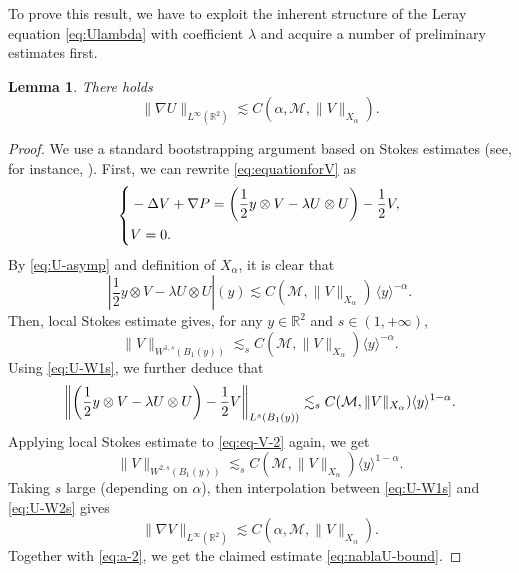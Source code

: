 \documentclass[12pt,reqno]{amsart}
\theoremstyle{plain}
\newtheorem{lemma}[theorem]{Lemma}
\theoremstyle{definition}
\newcommand{\R}{\mathbb{R}}
\newcommand{\M}{\mathcal{M}}
\renewcommand{\:}{\colon}
\let\div\relax
\DeclareMathOperator{\div}{div}
\numberwithin{equation}{section}
\numberwithin{figure}{section}
\begin{document}
To prove this result, we have to exploit the inherent structure of the Leray equation \eqref{eq:Ulambda} with coefficient $\lambda$  and acquire a number of preliminary estimates first. 


\begin{lemma}
	There holds
	\begin{equation} \label{eq:nablaU-bound}
		\|\nabla U\|_{L^\infty(\R^2)} \lesssim C(\alpha, \M, \|V\|_{X_\alpha}).
	\end{equation}
\end{lemma}

\begin{proof}
	We use a standard bootstrapping argument based on Stokes estimates  (see, for instance, \cite[Theorem IV.4.4 and Remark IV.4.2]{GaldiBook}).	First, we can rewrite \eqref{eq:equationforV} as
	\begin{equation} \label{eq:eq-V-2}
		\left\{\begin{aligned}
		&- \Delta V  + \nabla P =   \div \left( \frac{1}{2} y\otimes V - \lambda U \otimes U \right) - \frac12 V,  \\ 
		&\div V = 0.
		\end{aligned}\right.
	\end{equation}
	By \eqref{eq:U-asymp} and definition of $X_\alpha$, it is clear that
	\begin{equation}
		\left|\frac{1}{2} y\otimes V - \lambda U \otimes U\right| (y) \lesssim  C(\M, \|V\|_{X_\alpha}) \, \langle y \rangle^{-\alpha}.
	\end{equation}
	Then, local Stokes estimate gives, for any $y \in \R^2$ and $s \in (1, +\infty)$,
	\begin{equation} \label{eq:U-W1s}
		\| V\|_{W^{1,s}(B_1(y))} \lesssim_s C(\M, \|V\|_{X_\alpha}) \langle y \rangle^{-\alpha}.
	\end{equation}
	Using \eqref{eq:U-W1s}, we further deduce that
	\begin{equation}
		\left\|\div \left( \frac{1}{2} y\otimes V - \lambda U \otimes U \right) - \frac12 V \right\|_{L^s(B_1(y))} \lesssim_s C(\M, \|V\|_{X_\alpha}) \langle y \rangle^{1-\alpha}.
	\end{equation}
	Applying local Stokes estimate to \eqref{eq:eq-V-2} again, we get
	\begin{equation} \label{eq:U-W2s}
		\| V\|_{W^{2,s}(B_1(y))} \lesssim_s C(\M, \|V\|_{X_\alpha}) \langle y \rangle^{1-\alpha}.
	\end{equation}
	Taking $s$ large (depending on $\alpha$), then interpolation between \eqref{eq:U-W1s} and \eqref{eq:U-W2s} gives 
	\begin{equation}
		\|\nabla V\|_{L^\infty(\R^2)} \lesssim C(\alpha, \M, \|V\|_{X_\alpha}).
	\end{equation}
	Together with \eqref{eq:a-2}, we get the claimed estimate \eqref{eq:nablaU-bound}.
	
\end{proof}
\end{document}
